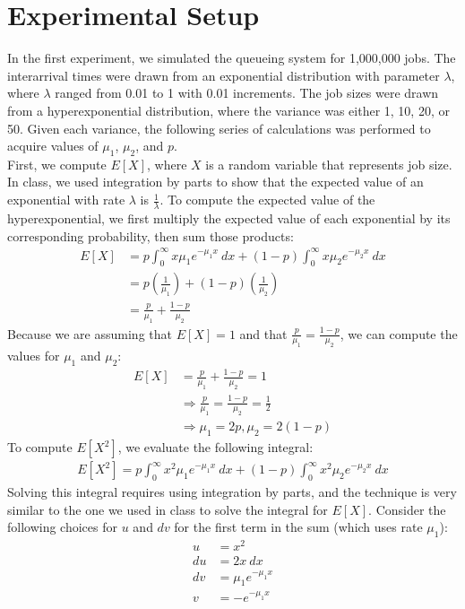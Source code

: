 \documentclass[12pt]{article}
\begin{document}
\section{Experimental Setup}
In the first experiment, we simulated the queueing system for 1,000,000 jobs. The interarrival times were drawn from an exponential distribution with parameter $\lambda$, where $\lambda$ ranged from 0.01 to 1 with 0.01 increments. The job sizes were drawn from a hyperexponential distribution, where the variance was either 1, 10, 20, or 50. Given each variance, the following series of calculations was performed to acquire values of $\mu_1$, $\mu_2$, and $p$. \\
First, we compute $E[X]$, where $X$ is a random variable that represents job size. In class, we used integration by parts to show that the expected value of an exponential with rate $\lambda$ is $\frac{1}{\lambda}$. To compute the expected value of the hyperexponential, we first multiply the expected value of each exponential by its corresponding probability, then sum those products: 
\begin{align*} 
E[X] &= p \int_{0}^{\infty} x \mu_1 e^{-\mu_1 x} ~ dx + (1-p) \int_{0}^{\infty} x \mu_2 e^{-\mu_2 x} ~ dx \\
&= p(\frac{1}{\mu_1}) + (1-p)(\frac{1}{\mu_2}) \\
&= \frac{p}{\mu_1} + \frac{1-p}{\mu_2}
\end{align*}
Because we are assuming that $E[X] = 1$ and that $\frac{p}{\mu_1} = \frac{1-p}{\mu_2}$, we can compute the values for $\mu_1$ and $\mu_2$: 
\begin{align*}
E[X] &= \frac{p}{\mu_1} + \frac{1-p}{\mu_2} = 1 \\
&\Rightarrow
\frac{p}{\mu_1} = \frac{1-p}{\mu_2} = \frac{1}{2} \\
&\Rightarrow
\mu_1 = 2p, \mu_2 = 2(1-p)
\end{align*}
To compute $E[X^2]$, we evaluate the following integral: 
\begin{align*} 
E[X^2] = p \int_{0}^{\infty} x^2 \mu_1 e^{-\mu_1 x} ~ dx + (1-p) \int_{0}^{\infty} x^2 \mu_2 e^{-\mu_2 x} ~ dx
\end{align*}
Solving this integral requires using integration by parts, and the technique is very similar to the one we used in class to solve the integral for $E[X]$. Consider the following choices for $u$ and $dv$ for the first term in the sum (which uses rate $\mu_1$):
\begin{align*}
u &= x^2 \\
du &= 2x \: dx \\ 
dv &= \mu_1e^{-\mu_1 x} \\
v &= -e^{-\mu_1 x}
\end{align*}
\end{document}
